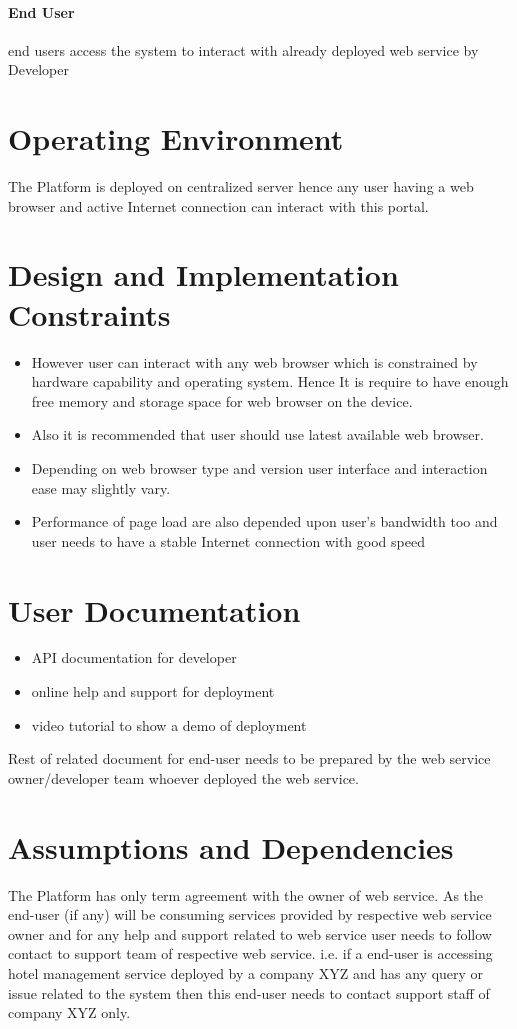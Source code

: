 \documentclass{scrreprt}
\begin{document}
\paragraph[endUser]{End User} end users access the system to interact with already deployed web service by Developer

\section{Operating Environment}
The Platform is deployed on centralized server hence any user having a web browser and active Internet connection can interact with this portal.

\section{Design and Implementation Constraints}
\begin{itemize}
	\item However user can interact with any web browser which is constrained by hardware capability and operating system. Hence It is require to have enough free memory and storage space for web browser on the device. 
	\item Also it is recommended that user should use latest available web browser.
	\item Depending on web browser type and version user interface and interaction ease may slightly vary.
	\item Performance of page load are also depended upon user's bandwidth too and user needs to have a stable Internet connection with good speed
\end{itemize}


\section{User Documentation}
\begin{itemize}
	\item API documentation for developer
	\item online help and support for deployment
	\item video tutorial to show a demo of deployment
\end{itemize}
Rest of related document for end-user needs to be prepared by the web service owner/developer team whoever deployed the web service.

\section{Assumptions and Dependencies}
The Platform has only term agreement with the owner of web service. As the end-user (if any) will be consuming services provided by respective web service owner and for any help and support related to web service user needs to follow contact to support team of respective web service. i.e. if a end-user is accessing hotel management service deployed by a company XYZ and has any query or issue related to the system then this end-user needs to contact support staff of company XYZ only.
\end{document}
